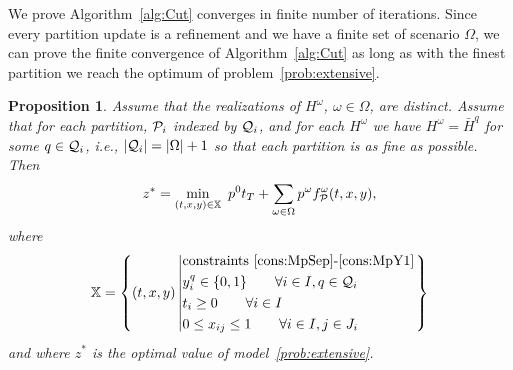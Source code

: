 \documentclass[11pt]{article}
\newtheorem{proposition}[theorem]{Proposition}
\newcommand{\cQ}{{\cal Q}}
\newcommand{\noi}{\noindent}
\newcommand{\cP}{{\cal P}}
\newcommand{\cH}{{\cal H}}
\newcommand{\tcr}{\textcolor{red}}
\begin{document}
	\noi We prove Algorithm~\ref{alg:Cut} converges in finite number of iterations. Since every partition update is a refinement and we have a finite set of scenario \(\Omega\), we can prove the finite convergence of Algorithm~\ref{alg:Cut} as long as with the finest partition we reach the optimum of problem~\eqref{prob:extensive}.
	
	\newpage 
	
	
	\begin{proposition} \label{prop:finestPar}
		Assume that the realizations of $H^\omega$, $\omega \in \Omega$, are distinct. Assume that for each partition, \({\cP}_i\) indexed by $\cQ_i$, and for each $H^\omega$ we have $H^\omega=\bar{H}^q$ for some $q \in \cQ_i$, i.e., $|\cQ_i|=|\Omega|+1$ so that each partition is as fine as possible. Then 
		\begin{equation}\label{eqn:proposition_equivalent}
		z^* = \min_{(t,x,y) \in \mathbb{X}}\ p^0 t_T + \sum_{\omega \in \Omega} p^\omega f^\omega_{{\cP}}(t,x,y),
		\end{equation}
		where 
		\begin{equation*}
		\mathbb{X} = \left\{(t,x,y) \left| 
		\begin{aligned}
		& \text{constraints } \eqref{cons:MpSep}\mbox{-}\eqref{cons:MpY1}\\ 
		&y_i^q \in \{0,1\} \qquad \forall i \in I, q \in {\cQ}_i\\
		& t_i \geq 0 \qquad \forall i \in I\\
		& 0 \leq x_{ij} \leq 1 \qquad \forall i \in I, j \in J_i
		\end{aligned}
		\right. \right\}
		\end{equation*}
		and where $z^*$ is the optimal value of model~\eqref{prob:extensive}.
	\end{proposition}
\end{document}
